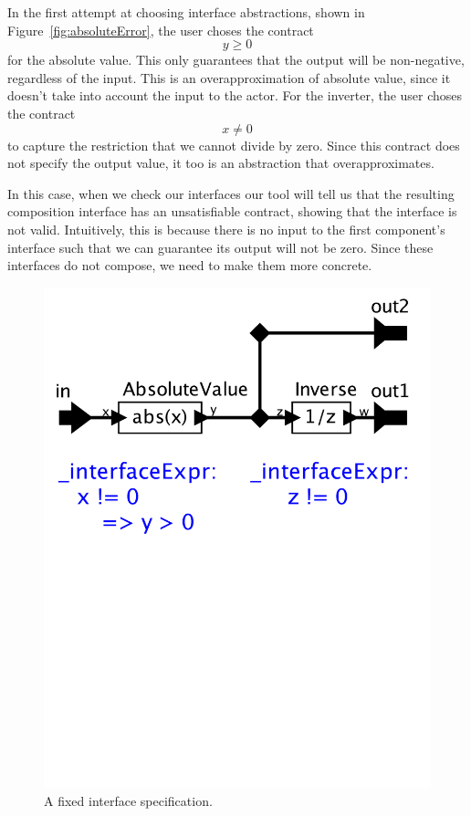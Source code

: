 \documentclass[preprint,11pt]{sigplanconf}
\begin{document}
In the first attempt at choosing interface abstractions, shown in
Figure~\ref{fig:absoluteError}, the user choses the contract
\[
y \ge 0
\]
for the absolute value.  This only guarantees that the output will be
non-negative, regardless of the input. This is an overapproximation of
absolute value, since it doesn't take into account the input to the actor.
%
For the inverter, the user choses the contract
\[
x \ne 0
\]
to capture the restriction that we cannot divide by zero.
Since this contract does not specify the output value, it too is an abstraction
that overapproximates.

In this case, when we check our interfaces our tool will tell us that the
resulting composition interface has an unsatisfiable contract, showing that the
interface is not valid. Intuitively, this is because there is no input to the
first component's interface such that we can guarantee its output will not be
zero. Since these interfaces do not compose, we need to make them more concrete.

\begin{figure}[htbp]
\centering
\includegraphics[width=\columnwidth]{figs/absoluteCorrected}
\caption{A fixed interface specification.}
\label{fig:absoluteCorrected}
\end{figure}
\end{document}

